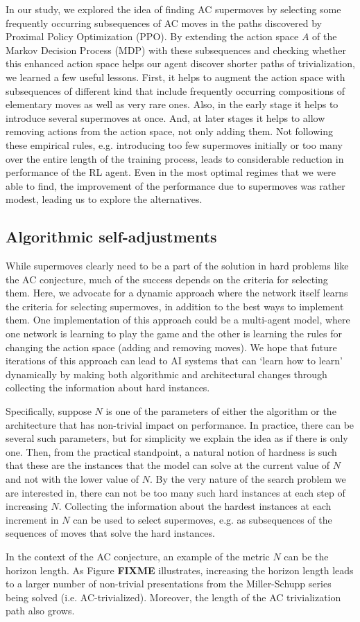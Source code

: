 In our study, we explored the idea of finding AC supermoves by selecting some frequently occurring subsequences of AC moves in the paths discovered by Proximal Policy Optimization (PPO). By extending the action space $A$ of the Markov Decision Process (MDP) with these subsequences and checking whether this enhanced action space helps our agent discover shorter paths of trivialization, we learned a few useful lessons. First, it helps to augment the action space with subsequences of different kind that include frequently occurring compositions of elementary moves as well as very rare ones. Also, in the early stage it helps to introduce several supermoves at once. And, at later stages it helps to allow removing actions from the action space, not only adding them. Not following these empirical rules, e.g. introducing too few supermoves initially or too many over the entire length of the training process, leads to considerable reduction in performance of the RL agent. Even in the most optimal regimes that we were able to find, the improvement of the performance due to supermoves was rather modest, leading us to explore the alternatives.

\subsection{Algorithmic self-adjustments}

While supermoves clearly need to be a part of the solution in hard problems like the AC conjecture, much of the success depends on the criteria for selecting them. Here, we advocate for a dynamic approach where the network itself learns the criteria for selecting supermoves, in addition to the best ways to implement them. One implementation of this approach could be a multi-agent model, where one network is learning to play the game and the other is learning the rules for changing the action space (adding and removing moves). We hope that future iterations of this approach can lead to AI systems that can `learn how to learn' dynamically by making both algorithmic and architectural changes through collecting the information about hard instances.

Specifically, suppose $N$ is one of the parameters of either the algorithm or the architecture that has non-trivial impact on performance. In practice, there can be several such parameters, but for simplicity we explain the idea as if there is only one. Then, from the practical standpoint, a natural notion of hardness is such that these are the instances that the model can solve at the current value of $N$ and not with the lower value of $N$. By the very nature of the search problem we are interested in, there can not be too many such hard instances at each step of increasing $N$. Collecting the information about the hardest instances at each increment in $N$ can be used to select supermoves, e.g. as subsequences of the sequences of moves that solve the hard instances.

In the context of the AC conjecture, an example of the metric $N$ can be the horizon length. As Figure {\bf FIXME} illustrates, increasing the horizon length leads to a larger number of non-trivial presentations from the Miller-Schupp series being solved (i.e. AC-trivialized). Moreover, the length of the AC trivialization path also grows.
